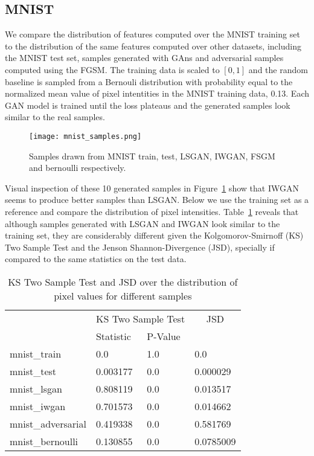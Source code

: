 \subsection{MNIST}
We compare the distribution of features computed over the MNIST training set 
to the distribution of the same features computed over other datasets, including
the MNIST test set, samples generated with GAns and adversarial samples computed 
using the FGSM. The training data is
scaled to $[0, 1]$ and the random baseline is sampled from a Bernouli distribution with 
probability equal to the normalized mean value of pixel intentities in the
MNIST training data, 0.13. Each GAN model is trained until the loss plateaus 
and the generated samples look similar to the real samples.

\begin{figure}[!h]
  \begin{center}
  \texttt{[image: mnist\_samples.png]}
  \caption{Samples drawn from MNIST train, test,
LSGAN, IWGAN, FSGM and bernoulli respectively.}
  \label{fig:mnist_samples}
  \end{center}
\end{figure}

Visual inspection of these 10 generated samples in
Figure~\ref{fig:mnist_samples} show that IWGAN seems to produce better samples
than LSGAN. Below we use the training set as a reference and compare the
distribution of pixel intensities.  Table~\ref{tbl:mnist_pixel} reveals that
although samples generated with LSGAN and IWGAN look similar to the training
set, they are considerably different given the Kolgomorov-Smirnoff (KS) Two
Sample Test and the Jenson Shannon-Divergence (JSD), specially if compared to
the same statistics on the test data. 

\begin{table}[!h]
\centering
\begin{tabular}{l|ll|l|}
                   & \multicolumn{2}{c|}{\cellcolor[HTML]{C0C0C0}KS Two Sample Test} & \multicolumn{1}{c|}{\cellcolor[HTML]{C0C0C0}JSD} \\
                   & Statistic   & P-Value   &                \\
mnist\_train       & 0.0         & 1.0       & 0.0            \\
mnist\_test        & 0.003177    & 0.0       & 0.000029       \\
mnist\_lsgan       & 0.808119    & 0.0       & 0.013517       \\
mnist\_iwgan       & 0.701573    & 0.0       & 0.014662       \\
mnist\_adversarial & 0.419338    & 0.0       & 0.581769       \\
mnist\_bernoulli   & 0.130855    & 0.0       & 0.0785009      
\end{tabular}
\caption{KS Two Sample Test and JSD over the distribution of pixel values for
different samples}
\label{tbl:mnist_pixel}
\end{table}

